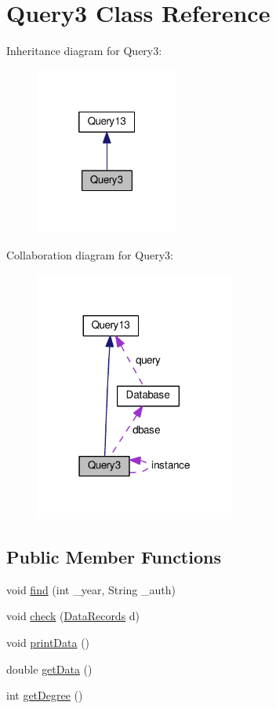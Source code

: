 \hypertarget{classQuery3}{}\section{Query3 Class Reference}
\label{classQuery3}


Inheritance diagram for Query3\+:\nopagebreak
\begin{figure}[H]
\begin{center}
\leavevmode
\includegraphics[width=133pt]{classQuery3__inherit__graph}
\end{center}
\end{figure}


Collaboration diagram for Query3\+:\nopagebreak
\begin{figure}[H]
\begin{center}
\leavevmode
\includegraphics[width=186pt]{classQuery3__coll__graph}
\end{center}
\end{figure}
\subsection*{Public Member Functions}
\begin{DoxyCompactItemize}
\item 
void \hyperlink{classQuery3_a90891105629ffe510b97ef9457ee999d}{find} (int \+\_\+year, String \+\_\+auth)
\item 
void \hyperlink{classQuery3_aa427e3890ba5a50c0fe65f8ec8c0b451}{check} (\hyperlink{classDataRecords}{Data\+Records} d)
\item 
void \hyperlink{classQuery3_a6cde68ceca0e88d2af13e31a5de0e9a4}{print\+Data} ()
\item 
double \hyperlink{classQuery3_a165950141428545cd3b1503e2e90b19f}{get\+Data} ()
\item 
int \hyperlink{classQuery3_aaf500171ac702620b4a7cdfdf99511e1}{get\+Degree} ()
\end{DoxyCompactItemize}
